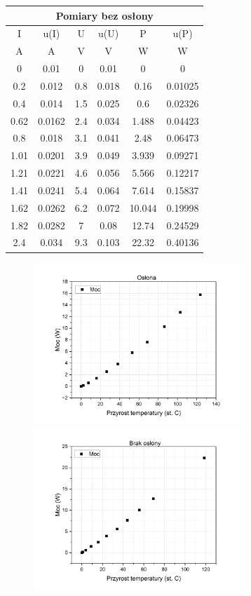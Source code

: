 \begin{center}
    \begin{tabular}{|c|c||c|c||c|c|}
        \hline
        \multicolumn{6}{|c|}{Pomiary bez osłony} \\
        \hline
        I    & u(I)   & U   & u(U)  & P      & u(P)    \\ \hline
        A    & A      & V   & V     & W      & W       \\ \hline
        0    & 0.01   & 0   & 0.01  & 0      & 0       \\ \hline
        0.2  & 0.012  & 0.8 & 0.018 & 0.16   & 0.01025 \\ \hline
        0.4  & 0.014  & 1.5 & 0.025 & 0.6    & 0.02326 \\ \hline
        0.62 & 0.0162 & 2.4 & 0.034 & 1.488  & 0.04423 \\ \hline
        0.8  & 0.018  & 3.1 & 0.041 & 2.48   & 0.06473 \\ \hline
        1.01 & 0.0201 & 3.9 & 0.049 & 3.939  & 0.09271 \\ \hline
        1.21 & 0.0221 & 4.6 & 0.056 & 5.566  & 0.12217 \\ \hline
        1.41 & 0.0241 & 5.4 & 0.064 & 7.614  & 0.15837 \\ \hline
        1.62 & 0.0262 & 6.2 & 0.072 & 10.044 & 0.19998 \\ \hline
        1.82 & 0.0282 & 7   & 0.08  & 12.74  & 0.24529 \\ \hline
        2.4  & 0.034  & 9.3 & 0.103 & 22.32  & 0.40136 \\ \hline
    \end{tabular}
\end{center}

\newpage
\begin{figure}[!ht]
    \centering
    \includegraphics[width = 80mm]{imgs/Graph3.png}
    \includegraphics[width = 80mm]{imgs/Graph4.png}
    \label{fig:wykresy_mocy}
\end{figure}

